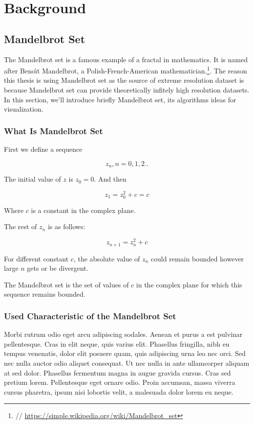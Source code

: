 
\chapter{Background} %

\label{Chapter2} %


\section{Mandelbrot Set}

The Mandelbrot set is a famous example of a fractal in mathematics. It is named after Beno\^{\i}t Mandelbrot, a Polish-French-American mathematician.\footnote{ // \url{https://simple.wikipedia.org/wiki/Mandelbrot_set}}. The reason this thesis is using Mandelbrot set as the source of extreme resolution dataset is because Mandelbrot set can provide theoretically infitely high resolution datasets. In this section, we'll introduce briefly Mandelbrot set, its algorithms ideas for visualization.

\subsection{What Is Mandelbrot Set}

First we define a sequence

\[z_n, n = 0, 1, 2 ..\]

The initial value of $z$ is $z_0 = 0$. And then

\[z_1 = z_0^2 + c = c\]

Where $c$ is a constant in the complex plane.

The rest of $z_n$ is as follows:

\[z_{n+1} = z_n^2 + c\]

For different constant $c$, the absolute value of $z_n$ could remain bounded however large $n$ gets or be divergent.

The Mandelbrot set is the set of values of $c$ in the complex plane for which this sequence remains bounded.

\subsection{Used Characteristic of the Mandelbrot Set}
Morbi rutrum odio eget arcu adipiscing sodales. Aenean et purus a est pulvinar pellentesque. Cras in elit neque, quis varius elit. Phasellus fringilla, nibh eu tempus venenatis, dolor elit posuere quam, quis adipiscing urna leo nec orci. Sed nec nulla auctor odio aliquet consequat. Ut nec nulla in ante ullamcorper aliquam at sed dolor. Phasellus fermentum magna in augue gravida cursus. Cras sed pretium lorem. Pellentesque eget ornare odio. Proin accumsan, massa viverra cursus pharetra, ipsum nisi lobortis velit, a malesuada dolor lorem eu neque.

